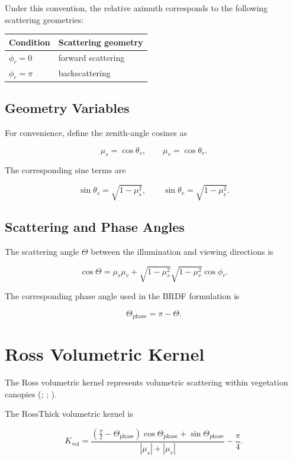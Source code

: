 \documentclass[
  11pt,
  letterpaper,
]{scrreprt}
\begin{document}
Under this convention, the relative azimuth corresponds to the following
scattering geometries:

\begin{longtable}[]{@{}ll@{}}
\toprule\noalign{}
Condition & Scattering geometry \\
\midrule\noalign{}
\endhead
\bottomrule\noalign{}
\endlastfoot
\(\phi_r=0\) & forward scattering \\
\(\phi_r=\pi\) & backscattering \\
\end{longtable}

\subsection{Geometry Variables}\label{geometry-variables}

For convenience, define the zenith-angle cosines as

\[
\mu_s = \cos\theta_s,
\qquad
\mu_v = \cos\theta_v.
\]

The corresponding sine terms are

\[
\sin\theta_s = \sqrt{1-\mu_s^2},
\qquad
\sin\theta_v = \sqrt{1-\mu_v^2}.
\]

\subsection{Scattering and Phase
Angles}\label{scattering-and-phase-angles}

The scattering angle \(\Theta\) between the illumination and viewing
directions is

\[
\cos\Theta
=
\mu_s\mu_v
+
\sqrt{1-\mu_s^2}
\sqrt{1-\mu_v^2}
\cos\phi_r.
\]

The corresponding phase angle used in the BRDF formulation is

\[
\Theta_{\mathrm{phase}}
=
\pi-\Theta.
\]

\section{Ross Volumetric Kernel}\label{ross-volumetric-kernel}

The Ross volumetric kernel represents volumetric scattering within
vegetation canopies (;
;
).

The RossThick volumetric kernel is

\[
K_{\mathrm{vol}}
=
\frac{
\left(
\frac{\pi}{2}-\Theta_{\mathrm{phase}}
\right)
\cos\Theta_{\mathrm{phase}}
+
\sin\Theta_{\mathrm{phase}}
}
{
|\mu_s|+|\mu_v|
}
-
\frac{\pi}{4}.
\]
\end{document}
